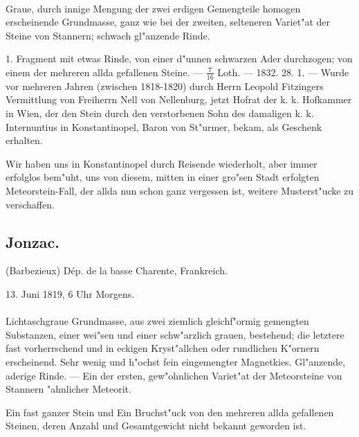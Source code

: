 \documentclass[a4paper, 11pt, oneside, polutonikogreek, german]{article}
\begin{document}
\paragraph{}
Graue, durch innige Mengung der zwei erdigen Gemengteile homogen erscheinende Grundmasse, ganz wie bei der zweiten, selteneren Variet"at der Steine von Stannern; schwach gl"anzende Rinde.

1. Fragment mit etwas Rinde, von einer d"unnen schwarzen Ader durchzogen; von einem der mehreren allda gefallenen Steine. --- $\frac{7}{16}$ Loth. --- 1832. 28. 1. --- Wurde vor mehreren Jahren (zwischen 1818-1820) durch Herrn Leopold Fitzingers Vermittlung von Freiherrn Nell von Nellenburg, jetzt Hofrat der k. k. Hofkammer in Wien, der den Stein durch den verstorbenen Sohn des damaligen k. k. Internuntius in Konstantinopel, Baron von St"urmer, bekam, als Geschenk erhalten.

\setlength{\leftskip}{10mm}
\setlength{\parindent}{0pt}

{\footnotesize Wir haben uns in Konstantinopel durch Reisende wiederholt, aber immer erfolglos bem"uht, uns von diesem, mitten in einer gro"sen Stadt erfolgten Meteorstein-Fall, der allda nun schon ganz vergessen ist, weitere Musterst"ucke zu verschaffen.}

\setlength{\leftskip}{0pt}
\setlength{\parindent}{20pt}

\subsection{Jonzac.}
\begin{center}
\small
(Barbezieux) Dép. de la basse Charente, Frankreich.

13. Juni 1819, 6 Uhr Morgens.
\end{center}
\paragraph{}
Lichtaschgraue Grundmasse, aus zwei ziemlich gleichf"ormig gemengten Substanzen, einer wei"sen und einer schw"arzlich grauen, bestehend; die letztere fast vorherrschend und in eckigen Kryst"allchen oder rundlichen K"ornern erscheinend. Sehr wenig und h"ochst fein eingemengter Magnetkies. Gl"anzende, aderige Rinde. --- Ein der ersten, gew"ohnlichen Variet"at der Meteorsteine von Stannern "ahnlicher Meteorit.

Ein fast ganzer Stein und Ein Bruchst"uck von den mehreren allda gefallenen Steinen, deren Anzahl und Gesamtgewicht nicht bekannt geworden ist.
\end{document}
